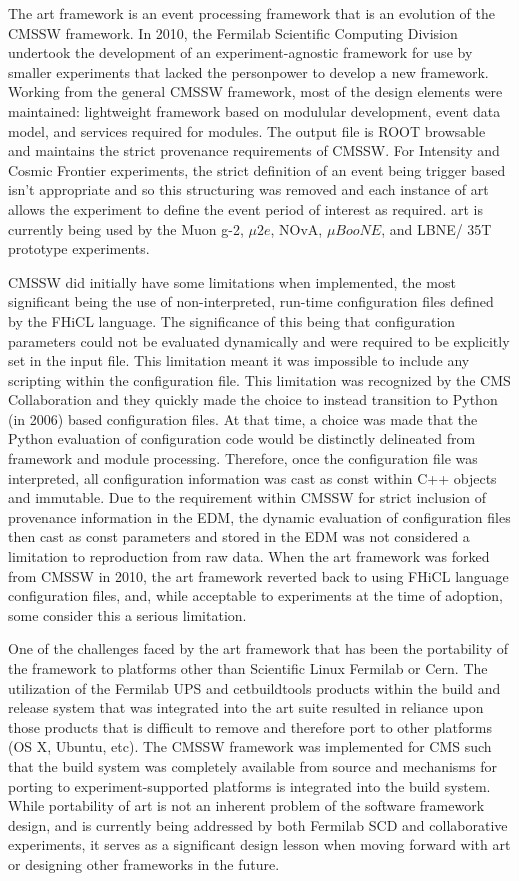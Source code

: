 The art framework is an event processing framework that is an evolution of the CMSSW framework. In 2010, the Fermilab Scientific Computing Division undertook the development of an experiment-agnostic framework for use by smaller experiments that lacked the personpower to develop a new framework. Working from the general CMSSW framework, most of the design elements were maintained: lightweight framework based on modulular development, event data model, and services required for modules. The output file is ROOT browsable and maintains the strict provenance requirements of CMSSW. For Intensity and Cosmic Frontier experiments, the strict definition of an event being trigger based isn't appropriate and so this structuring was removed and each instance of art allows the experiment to define the event period of interest as required. art is currently being used by the Muon g-2, $\mu2e$, NOvA, $\mu BooNE$, and LBNE/ 35T prototype experiments.

CMSSW did initially have some limitations when implemented, the most significant being the use of non-interpreted, run-time configuration files defined by the FHiCL language. The significance of this being that configuration parameters could not be evaluated dynamically and were required to be explicitly set in the input file. This limitation meant it was impossible to include any scripting within the configuration file. This limitation was recognized by the CMS Collaboration and they quickly made the choice to instead transition to Python (in 2006) based configuration files. At that time, a choice was made that the Python evaluation of configuration code would be distinctly delineated from framework and module processing. Therefore, once the configuration file was interpreted, all configuration information was cast as const within C++ objects and immutable. Due to the requirement within CMSSW for strict inclusion of provenance information in the EDM, the dynamic evaluation of configuration files then cast as const parameters and stored in the EDM was not considered a limitation to reproduction from raw data. When the art framework was forked from CMSSW in 2010, the art framework reverted back to using FHiCL language configuration files, and, while acceptable to experiments at the time of adoption, some consider this a serious limitation.

One of the challenges faced by the art framework that has been the portability of the framework to platforms other than Scientific Linux Fermilab or Cern. The utilization of the Fermilab UPS and cetbuildtools products within the build and release system that was integrated into the art suite resulted in reliance upon those products that is difficult to remove and therefore port to other platforms (OS X, Ubuntu, etc). The CMSSW framework was implemented for CMS such that the build system was completely available from source and mechanisms for porting to experiment-supported platforms is integrated into the build system. While portability of art is not an inherent problem of the software framework design, and is currently being addressed by both Fermilab SCD and collaborative experiments, it serves as a significant design lesson when moving forward with art or designing other frameworks in the future.

